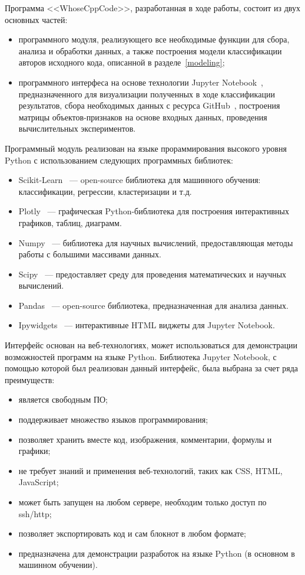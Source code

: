 Программа <<WhoseCppCode>>, разработанная в ходе работы, состоит из двух основных частей:
\begin{itemize}
 \item программного модуля, реализующего все необходимые функции для сбора, анализа и обработки данных, 
а также построения модели классификации авторов исходного кода, описанной в разделе~\ref{modeling};
 \item программного интерфеса на основе технологии Jupyter Notebook~\cite{jupyter}, предназначенного 
 для визуализации полученных в ходе классификации результатов, сбора необходимых данных с ресурса GitHub~\cite{GitHub},
 построения матрицы объектов-признаков на основе входных данных, проведения вычислительных экспериментов.
\end{itemize}

Программный модуль реализован на языке прораммирования высокого уровня Python с использованием следующих 
программных библиотек:
\begin{itemize}
 \item Scikit-Learn~\cite{scikit} --- open-source библиотека для машинного обучения: классификации, регрессии, кластеризации и т.д.
 \item Plotly~\cite{plotly} --- графическая Python-библиотека для построения интерактивных графиков, таблиц, диаграмм.
 \item Numpy~\cite{numpy} --- библиотека для научных вычислений, предоставляющая методы работы с большими массивами данных.
 \item Scipy~\cite{scipy} --- предоставляет среду для проведения математических и научных вычислений.
 \item Pandas~\cite{pandas} --- open-source библиотека, предназначенная для анализа данных.
 \item Ipywidgets~\cite{widgets} --- интерактивные HTML виджеты для Jupyter Notebook.
\end{itemize}

Интерфейс основан на веб-технологиях, может использоваться для демонстрации возможностей
программ на языке Python. Библиотека Jupyter Notebook, с помощью которой был реализован
данный интерфейс, была выбрана за счет ряда преимуществ:
\begin{itemize}
 \item является свободным ПО;
 \item поддерживает множество языков программирования;
 \item позволяет хранить вместе код, изображения, комментарии, формулы и графики;
 \item не требует знаний и применения веб-технологий, таких как CSS, HTML, JavaScript;
 \item может быть запущен на любом сервере, необходим только доступ по ssh/http;
 \item позволяет экспортировать код и сам блокнот в любом формате;
 \item предназначена для демонстрации разработок на языке Python (в основном в машинном обучении).
\end{itemize}

